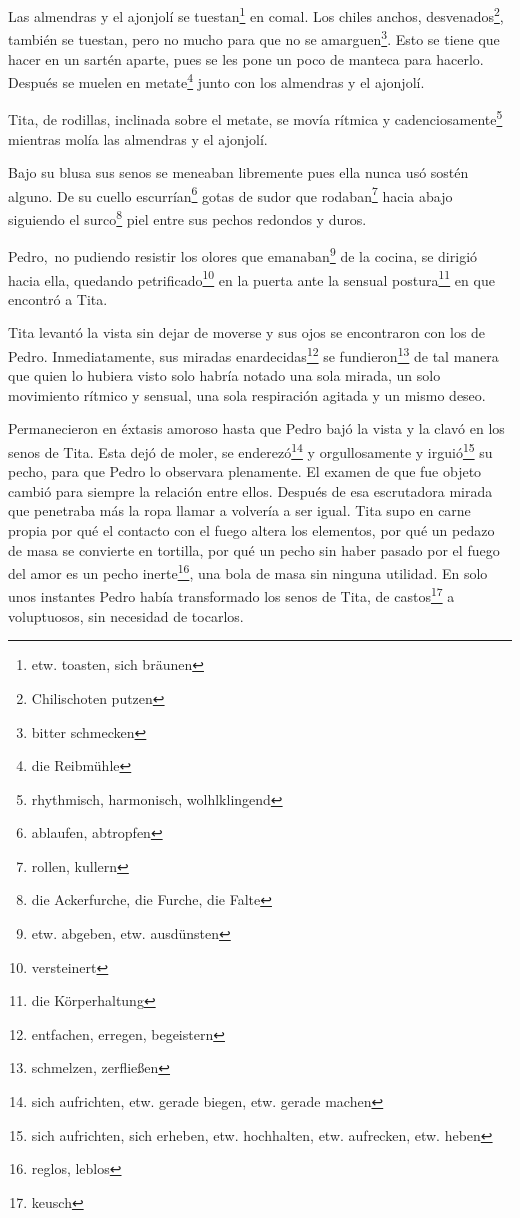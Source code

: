 Las almendras y el ajonjolí se tuestan\footnote{etw. toasten, sich bräunen} en comal.
Los chiles anchos, desvenados\footnote{Chilischoten putzen},
también se tuestan, pero no mucho para que no se amarguen\footnote{bitter schmecken}.
Esto se tiene que hacer en un sartén aparte, pues se les pone un poco de
manteca para hacerlo. Después se muelen en metate\footnote{die Reibmühle} junto con los
almendras y el ajonjolí.

Tita, de rodillas, inclinada sobre el metate, se movía rítmica y cadenciosamente\footnote{rhythmisch, harmonisch, wolhlklingend} mientras
molía las almendras y el ajonjolí.

Bajo su blusa sus senos se meneaban libremente pues ella nunca usó
sostén alguno. De su cuello escurrían\footnote{ablaufen, abtropfen} gotas
de sudor que rodaban\footnote{rollen, kullern} hacia abajo siguiendo el surco\footnote{die Ackerfurche, die Furche, die Falte} piel entre sus
pechos redondos y duros.

Pedro,~no pudiendo resistir los olores que emanaban\footnote{etw. abgeben, etw. ausdünsten}
de la cocina, se dirigió hacia ella, quedando petrificado\footnote{versteinert}
en la puerta ante la sensual postura\footnote{die Körperhaltung} en que
encontró a Tita.

Tita levantó la vista sin dejar de moverse y sus ojos se encontraron con
los de Pedro. Inmediatamente, sus miradas enardecidas\footnote{entfachen, erregen, begeistern}
se fundieron\footnote{schmelzen, zerfließen} de
tal manera que quien lo hubiera visto solo habría notado una sola
mirada, un solo movimiento rítmico y sensual, una sola respiración
agitada y un mismo deseo.

Permanecieron en éxtasis amoroso hasta que Pedro bajó la vista y la
clavó en los senos de Tita. Esta dejó de moler, se enderezó\footnote{sich aufrichten, etw. gerade biegen, etw. gerade machen}
y orgullosamente y irguió\footnote{sich aufrichten, sich erheben, etw. hochhalten, etw. aufrecken, etw. heben}
su pecho, para que Pedro lo observara plenamente. El examen de que fue objeto
cambió para siempre la relación entre ellos. Después de esa escrutadora
mirada que penetraba más la ropa llamar a volvería a ser igual. Tita supo
en carne propia por qué el contacto con el fuego altera los elementos,
por qué un pedazo de masa se convierte en tortilla, por qué un pecho sin
haber pasado por el fuego del amor es un pecho inerte\footnote{reglos, leblos},
una bola de masa sin ninguna utilidad. En solo unos instantes Pedro había
transformado los senos de Tita, de castos\footnote{keusch} a voluptuosos,
sin necesidad de tocarlos.

